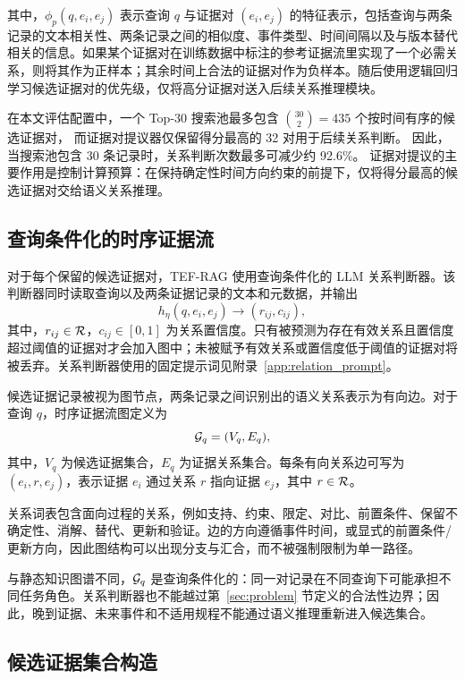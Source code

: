 其中，$\phi_p(q,e_i,e_j)$ 表示查询 $q$ 与证据对 $(e_i,e_j)$ 的特征表示，包括查询与两条记录的文本相关性、两条记录之间的相似度、事件类型、时间间隔以及与版本替代相关的信息。如果某个证据对在训练数据中标注的参考证据流里实现了一个必需关系，则将其作为正样本；其余时间上合法的证据对作为负样本。随后使用逻辑回归学习候选证据对的优先级，仅将高分证据对送入后续关系推理模块。

在本文评估配置中，一个 Top-30 搜索池最多包含
$\binom{30}{2}=435$ 个按时间有序的候选证据对，
而证据对提议器仅保留得分最高的 32 对用于后续关系判断。
因此，当搜索池包含 30 条记录时，关系判断次数最多可减少约 92.6\%。
证据对提议的主要作用是控制计算预算：在保持确定性时间方向约束的前提下，仅将得分最高的候选证据对交给语义关系推理。

\subsection{查询条件化的时序证据流}

对于每个保留的候选证据对，TEF-RAG 使用查询条件化的 LLM 关系判断器。该判断器同时读取查询以及两条证据记录的文本和元数据，并输出
\begin{equation}
h_{\eta}(q,e_i,e_j)
\rightarrow
(r_{ij},c_{ij}),
\end{equation}
其中，$r_{ij}\in\mathcal{R}$，$c_{ij}\in[0,1]$ 为关系置信度。只有被预测为存在有效关系且置信度超过阈值的证据对才会加入图中；未被赋予有效关系或置信度低于阈值的证据对将被丢弃。关系判断器使用的固定提示词见附录~\ref{app:relation_prompt}。

候选证据记录被视为图节点，两条记录之间识别出的语义关系表示为有向边。对于查询 $q$，时序证据流图定义为
\begin{equation}
\mathcal{G}_q=(V_q,E_q),
\end{equation}
其中，$V_q$ 为候选证据集合，$E_q$ 为证据关系集合。每条有向关系边可写为 $(e_i,r,e_j)$，表示证据 $e_i$ 通过关系 $r$ 指向证据 $e_j$，其中 $r\in\mathcal{R}$。

关系词表包含面向过程的关系，例如支持、约束、限定、对比、前置条件、保留不确定性、消解、替代、更新和验证。边的方向遵循事件时间，或显式的前置条件/更新方向，因此图结构可以出现分支与汇合，而不被强制限制为单一路径。

与静态知识图谱不同，$\mathcal{G}_q$ 是查询条件化的：同一对记录在不同查询下可能承担不同任务角色。关系判断器也不能越过第~\ref{sec:problem} 节定义的合法性边界；因此，晚到证据、未来事件和不适用规程不能通过语义推理重新进入候选集合。

\subsection{候选证据集合构造}

